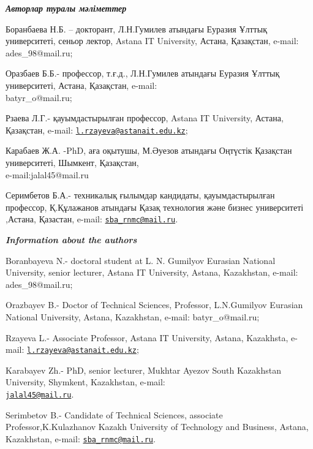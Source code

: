 \begin{authorinfo}
\hspace{1em}\emph{{\bfseries Авторлар туралы мәліметтер}}

Боранбаева Н.Б. -- докторант, Л.Н.Гумилев атындағы Еуразия Ұлттық
университеті, сеньор лектор, Astana IT University, Астана, Қазақстан,
e-mail: ades\_98@mail.ru;

Оразбаев Б.Б.- профессор, т.ғ.д., Л.Н.Гумилев атындағы Еуразия Ұлттық
университеті, Астана, Қазақстан, e-mail: \\batyr\_o@mail.ru;

Рзаева Л.Г.- қауымдастырылған профессор, Astana IT University, Астана,
Қазақстан, e-mail:
\href{mailto:l.rzayeva@astanait.edu.kz}{\nolinkurl{l.rzayeva@astanait.edu.kz}};

Карабаев Ж.А. -PhD, аға оқытушы, М.Әуезов атындағы Оңтүстік Қазақстан
университеті, Шымкент, Қазақстан,\\ e-mail:jalal45@mail.ru

Серимбетов Б.А.- техникалық ғылымдар кандидаты, қауымдастырылған
профессор, Қ.Құлажанов атындағы Қазақ технология және бизнес
университеті ,Астана, Қазастан, e-mail:
\href{mailto:sba_rnmc@mail.ru}{\nolinkurl{sba\_rnmc@mail.ru}}.

\hspace{1em}\emph{{\bfseries Information about the authors}}

Boranbayeva N.- doctoral student at L. N. Gumilyov Eurasian National
University, senior lecturer, Astana IT University, Astana, Kazakhstan,
e-mail: ades\_98@mail.ru;

Orazbayev B.- Doctor of Technical Sciences, Professor, L.N.Gumilyov
Eurasian National University, Astana, Kazakhstan, e-mail:
batyr\_o@mail.ru;

Rzayeva L.- Associate Professor, Astana IT University, Astana,
Kazakhsta, e-mail:
\href{mailto:l.rzayeva@astanait.edu.kz}{\nolinkurl{l.rzayeva@astanait.edu.kz}};

Karabayev Zh.- PhD, senior lecturer, Mukhtar Ayezov South Kazakhstan
University, Shymkent, Kazakhstan, e-mail:
\\\href{mailto:jalal45@mail.ru}{\nolinkurl{jalal45@mail.ru}}.

Serimbetov B.- Candidate of Technical Sciences, associate
Professor,K.Kulazhanov Kazakh University of Technology and Business,
Astana, Kazakhstan, e-mail:
\href{mailto:sba_rnmc@mail.ru}{\nolinkurl{sba\_rnmc@mail.ru}}.
\end{authorinfo}
